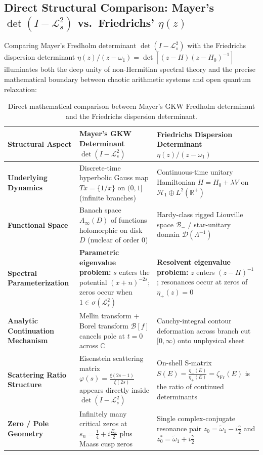 \documentclass[11pt,a4paper]{article}
\newcommand{\Det}{\operatorname{det}}
\begin{document}
\subsection{Direct Structural Comparison: Mayer's $\Det(I - \mathcal{L}_s^2)$ vs.\ Friedrichs' $\eta(z)$}

Comparing Mayer's Fredholm determinant $\Det(I - \mathcal{L}_s^2)$ with the Friedrichs dispersion determinant $\eta(z)/(z - \omega_1) = \Det[(z - H)(z - H_0)^{-1}]$ illuminates both the deep unity of non-Hermitian spectral theory and the precise mathematical boundary between chaotic arithmetic systems and open quantum relaxation:

\begin{table}[htbp]
\centering
\caption{Direct mathematical comparison between Mayer's GKW Fredholm determinant and the Friedrichs dispersion determinant.}
\label{tab:mayer_vs_friedrichs}
\renewcommand{\arraystretch}{1.35}
\begin{tabular}{@{} >{\bfseries}p{3.0cm} p{5.6cm} p{5.6cm} @{}}
\toprule
Structural Aspect & Mayer's GKW Determinant $\Det(I - \mathcal{L}_s^2)$ & Friedrichs Dispersion Determinant $\eta(z)/(z - \omega_1)$ \\
\midrule
Underlying Dynamics & Discrete-time hyperbolic Gauss map $Tx = \{1/x\}$ on $(0,1]$ (infinite branches) & Continuous-time unitary Hamiltonian $H = H_0 + \lambda V$ on $\mathcal{H}_1 \oplus L^2(\mathbb{R}^+)$ \\
Functional Space & Banach space $A_\infty(D)$ of functions holomorphic on disk $D$ (nuclear of order $0$) & Hardy-class rigged Liouville space $\mathcal{B}_-$ / star-unitary domain $\mathcal{D}(\Lambda^{-1})$ \\
Spectral Parameterization & \textbf{Parametric eigenvalue problem:} $s$ enters the potential $(x+n)^{-2s}$; zeros occur when $1 \in \sigma(\mathcal{L}_s^2)$ & \textbf{Resolvent eigenvalue problem:} $z$ enters $(z - H)^{-1}$; resonances occur at zeros of $\eta_+(z) = 0$ \\
Analytic Continuation Mechanism & Mellin transform + Borel transform $\mathcal{B}[f]$ cancels pole at $t=0$ across $\mathbb{C}$ & Cauchy-integral contour deformation across branch cut $[0,\infty)$ onto unphysical sheet \\
Scattering Ratio Structure & Eisenstein scattering matrix $\varphi(s) = \frac{\xi(2s-1)}{\xi(2s)}$ appears directly inside $\Det(I - \mathcal{L}_s^2)$ & On-shell S-matrix $S(E) = \frac{\eta_-(E)}{\eta_+(E)} = \zeta_{\mathrm{Fr}}(E)$ is the ratio of continued determinants \\
Zero / Pole Geometry & Infinitely many critical zeros at $s_n = \frac{1}{4} + i\frac{E_n}{2}$ plus Maass cusp zeros & Single complex-conjugate resonance pair $z_0 = \tilde{\omega}_1 - i\frac{\gamma}{2}$ and $z_0^* = \tilde{\omega}_1 + i\frac{\gamma}{2}$ \\
\bottomrule
\end{tabular}
\end{table}
\end{document}

